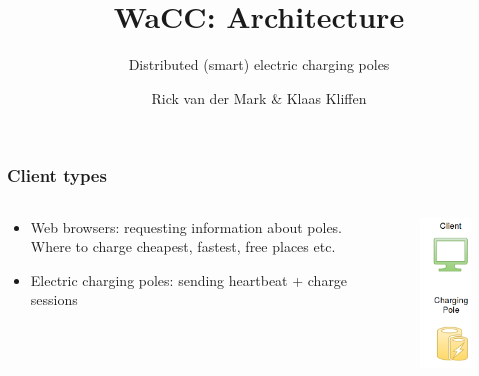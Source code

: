 \documentclass[11pt]{beamer}
\title{WaCC: Architecture}
\subtitle{Distributed (smart) electric charging poles}
\author{Rick van der Mark \& Klaas Kliffen}
\begin{document}
\maketitle

\begin{frame}
\frametitle{Client types}
\begin{columns}
    \begin{column}{.5\textwidth}
        \begin{itemize}
            \item Web browsers: requesting information about poles. Where to charge cheapest, fastest, free places etc.
            \item Electric charging poles: sending heartbeat + charge sessions
        \end{itemize}
    \end{column}
    \begin{column}{.5\textwidth}
        \begin{figure}
        \centering
        \includegraphics[scale=.4]{clients.png}
        \end{figure}
    \end{column}
\end{columns}
\end{frame}
\end{document}
